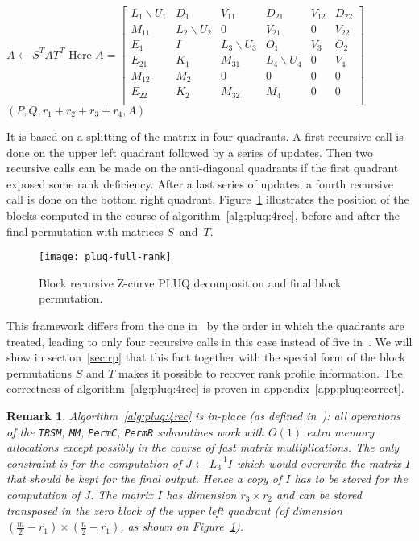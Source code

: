 \documentclass{article}
\newcommand{\customvspace}[1]{}
\newcommand{\trsm}{\texttt{TRSM}\xspace}
\newcommand{\MM}{\texttt{MM}\xspace}
\newcommand{\mm}{\frac{m}{2}}
\newcommand{\nn}{\frac{n}{2}}
\newtheorem{remark}{Remark}
\begin{document}
{\begin{algorithm}[H]
\begin{algorithmic}
\State $A\leftarrow S^TAT^T$ 
\State Here $A=
\begin{bmatrix}
  L_1\backslash U_1 &D_1              &V_{11} &D_{21} & V_{12}&D_{22}\\
    M_{11}          &L_2\backslash U_2 & 0 &       V_{21} & 0 & V_{22}\\ 
     E_1           &       I         &L_3\backslash U_3 & O_1 & V_3&O_2 \\
     E_{21}         &K_1              & M_{31}            & L_4\backslash U_4     &0&V_4 \\
     M_{12}         & M_2             & 0 &0 &0& 0\\
     E_{22}         & K_2             & M_{32}           & M_4 & 0 &0\\
\end{bmatrix}$
\Return $(P,Q,r_1+r_2+r_3+r_4,A)$
\end{algorithmic}
\end{algorithm}
}


It is based on a splitting of the matrix in four quadrants. A first recursive
call is done on the upper left quadrant followed by a series of updates. Then
two recursive calls can be made on the anti-diagonal quadrants if the first
quadrant exposed some rank deficiency.
After a last series of updates, a fourth recursive call is done on the bottom
right quadrant.
Figure~\ref{fig:pluq:rec} illustrates the position of the blocks computed in the
course of algorithm~\ref{alg:pluq:4rec}, before and after the final permutation
with matrices $S$~and~$T$.
\begin{figure}[ht]\centering
\texttt{[image: pluq-full-rank]}
\caption{Block recursive Z-curve PLUQ decomposition and final block permutation.}
\label{fig:pluq:rec}
\customvspace{-3pt}
\end{figure}

This framework differs from the one in~\cite{jgd:2002:PComp} by the order in
which the quadrants are treated, leading to only four recursive calls in this
case instead of five in~\cite{jgd:2002:PComp}. We will show in
section~\ref{sec:rp} that this fact together with the special form of the block
permutations $S$ and $T$ makes it possible to recover rank profile information. 
The correctness of algorithm~\ref{alg:pluq:4rec} is proven in appendix~\ref{app:pluq:correct}.
\begin{remark}
Algorithm~\ref{alg:pluq:4rec} is in-place (as defined
in~\cite[Definition 1]{JPS:2011}):
all operations of the \trsm, \MM,
\texttt{PermC}, \texttt{PermR} subroutines work with $O(1)$ extra memory
allocations except possibly in the course of fast matrix multiplications.
The only constraint is for the computation of $J\leftarrow L_3^{-1}I$ which
would overwrite the matrix $I$ that should be kept  for the final output. 
Hence a copy of $I$ has to  be stored for the computation of $J$. The matrix $I$
has dimension $r_3\times r_2$ and can be stored transposed in the zero block of
the upper left quadrant (of dimension $(\mm-r_1)\times (\nn-r_1)$, as
shown on Figure~\ref{fig:pluq:rec}).
\end{remark}
\end{document}
